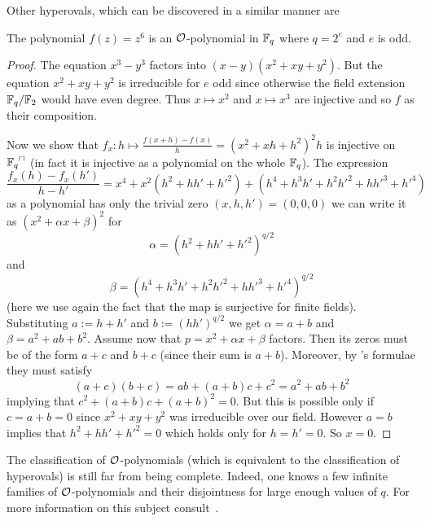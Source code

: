 Other hyperovals, which can be discovered in a similar manner are

\begin{corollary}
    The polynomial $f(z)=z^6$ is an $\mathcal{O}$-polynomial in $\mathbb{F}_{q}$ where $q=2^e$ and $e$ is odd.
\end{corollary}

\begin{proof}
    The equation $x^3-y^3$ factors into $(x-y)(x^2+xy+y^2)$. But the equation $x^2+xy+y^2$ is irreducible for $e$ odd since otherwise the field extension $\mathbb{F}_{q}/\mathbb{F}_{2}$ would have even degree. Thus $x\mapsto x^2$ and $x\mapsto x^3$ are injective and so $f$ as their composition.
    
    Now we show that $f_x:h\mapsto \frac{f(x+h)-f(x)}{h}={(x^2+xh+h^2)}^2h$ is injective on $\units{\field{q}}$ (in fact it is injective as a polynomial on the whole $\mathbb{F}_{q}$). The expression
    $$
    \frac{f_x(h)-f_x(h')}{h-h'} = x^4+x^2(h^2+hh'+h'^2)+(h^4+h^3h'+h^2h'^2+hh'^3+h'^4)
    $$
    as a polynomial has only the trivial zero $(x,h,h')=(0,0,0)$ we can write it as ${(x^2+\alpha x+\beta)}^2$ for
    $$
    \alpha={(h^2+hh'+h'^2)}^{q/2}
    $$ and
    $$
    \beta={(h^4+h^3h'+h^2h'^2+hh'^3+h'^4)}^{q/2}
    $$ (here we use again the fact that the  map is surjective for finite fields).
    Substituting $a:=h+h'$ and $b:={(hh')}^{q/2}$ we get $\alpha=a+b$ and $\beta=a^2+ab+b^2$.
    Assume now that $p=x^2+\alpha x+\beta$ factors. Then its zeros must be of the form $a+c$ and $b+c$ (since their sum is $a+b$). Moreover, by 's formulae they must satisfy
    $$
    (a+c)(b+c)=ab+(a+b)c+c^2=a^2+ab+b^2
    $$
    implying that $c^2+(a+b)c+{(a+b)}^2=0$. But this is possible only if $c=a+b=0$ since $x^2+xy+y^2$ was irreducible over our field. However $a=b$ implies that $h^2+hh'+h'^2=0$ which holds only for $h=h'=0$. So $x=0$.
\end{proof}

The classification of $\mathcal{O}$-polynomials (which is equivalent to the classification of hyperovals) is still far from being complete. Indeed, one knows a few infinite families of $\mathcal{O}$-polynomials and their disjointness for large enough values of $q$. For more information on this subject consult~\cite{caullery2014classexchypero}.



